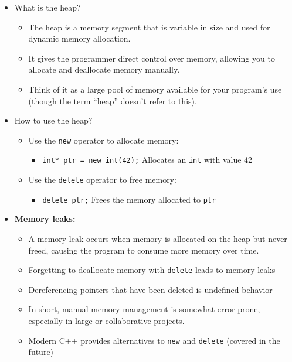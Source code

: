 \documentclass{article}
\begin{document}
\begin{itemize}
	\item What is the heap?
	\begin{itemize}
		\item The heap is a memory segment that is variable in size and used for dynamic memory allocation.
        \item It gives the programmer direct control over memory, allowing you to allocate and deallocate memory manually.
        \item Think of it as a large pool of memory available for your program's use (though the term ``heap'' doesn't refer to this).
	\end{itemize}
	\item How to use the heap?
	\begin{itemize}
		\item Use the \texttt{new} operator to allocate memory:
		\begin{itemize}
		\item \texttt{int* ptr = new int(42);} Allocates an \texttt{int} with value 42
		\end{itemize}
		\item Use the \texttt{delete} operator to free memory:
		\begin{itemize}
		\item \texttt{delete ptr;} Frees the memory allocated to \texttt{ptr}
		\end{itemize}
	\end{itemize}
	
	\item \textbf{Memory leaks:}
	\begin{itemize}
		\item A memory leak occurs when memory is allocated on the heap but never freed, causing the program to consume more memory over time.
		\item Forgetting to deallocate memory with \texttt{delete} leads to memory leaks
		\item Dereferencing pointers that have been deleted is undefined behavior
		\item In short, manual memory management is somewhat error prone, especially in large or collaborative projects.
		\item Modern C++ provides alternatives to \texttt{new} and \texttt{delete} (covered in the future)
	\end{itemize}
	
\end{itemize}
\end{document}
